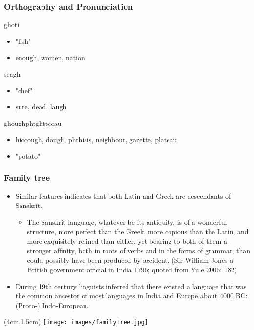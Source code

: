 \documentclass[12pt, table]{beamer}
\begin{document}
\begin{frame}
\frametitle{Orthography and Pronunciation}
ghoti
\begin{itemize}
\item "fish"
\item enou\uline{gh}, w\uline{o}men, na\uline{ti}on
\end{itemize}
seagh
\begin{itemize}
\item "chef"
\item \uline{s}ure, d\uline{ea}d, lau\uline{gh}
\end{itemize}
ghoughphtghtteeau
\begin{itemize}
\item hiccou\uline{gh}, d\uline{ough}, \uline{pht}hisis, nei\uline{gh}bour, gaze\uline{tte}, plat\uline{eau}
\item "potato"
\end{itemize}
\end{frame}

\begin{frame}
\frametitle{Family tree}
\begin{itemize}
\item Similar features indicates that both Latin and Greek are descendants of Sanskrit.
\begin{itemize}
\item The Sanskrit language, whatever be its antiquity, is of a wonderful structure, more perfect than the Greek, more copious than the Latin, and more exquisitely refined than either, yet bearing to both of them a stronger affinity, both in roots of verbs and in the forms of grammar, than could possibly have been produced by accident. (Sir William Jones a British government official in India 1796; quoted from Yule 2006: 182)
\end{itemize}
\item During 19th century linguists inferred that there existed a language that was the common ancestor of most languages in India and Europe about 4000 BC: \\ (Proto-) Indo-European.
\end{itemize}
\end{frame}

\begin{frame}
\begin{textblock*}{10cm}(4cm,1.5cm)
\texttt{[image: images/familytree.jpg]}
\end{textblock*}
\end{frame}
\end{document}
